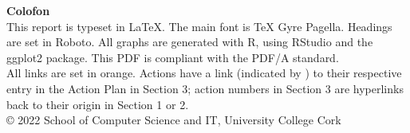 
\vspace*{10cm}


\begin{minipage}{7cm}
\textbf{Colofon}\\
This report is typeset in \LaTeX{}. 
The main font is \TeX{} Gyre Pagella. Headings are set in Roboto.
All graphs are generated with R, using RStudio and the ggplot2 package. This PDF is compliant with the PDF/A standard.\\[.1in]

All links are set in orange. Actions have a link (indicated by \gotoactionsymbol{}) to their respective entry in the Action Plan in Section 3; action numbers in Section 3 are hyperlinks back to their origin in Section 1 or 2.\\[.1in]

\copyright{} 2022 School of Computer Science and IT, University College Cork
\end{minipage}

